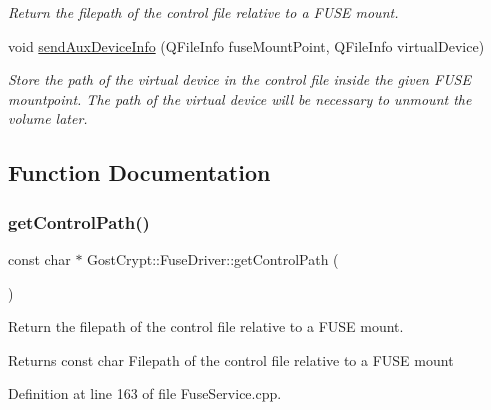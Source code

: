\begin{DoxyCompactItemize}
\begin{DoxyCompactList}\small\item\em Return the filepath of the control file relative to a F\+U\+SE mount. \end{DoxyCompactList}\item 
void \hyperlink{namespace_gost_crypt_1_1_fuse_driver_af0bbb5bc0d09fd490f41a93dc588ce1d}{send\+Aux\+Device\+Info} (Q\+File\+Info fuse\+Mount\+Point, Q\+File\+Info virtual\+Device)
\begin{DoxyCompactList}\small\item\em Store the path of the virtual device in the control file inside the given F\+U\+SE mountpoint. The path of the virtual device will be necessary to unmount the volume later. \end{DoxyCompactList}\end{DoxyCompactItemize}


\subsection{Function Documentation}
\mbox{\label{namespace_gost_crypt_1_1_fuse_driver_aea46579083a08cf177ef77110d5e6d2f}} 
\subsubsection{\texorpdfstring{get\+Control\+Path()}{getControlPath()}}
{\footnotesize\ttfamily const char $\ast$ Gost\+Crypt\+::\+Fuse\+Driver\+::get\+Control\+Path (\begin{DoxyParamCaption}{ }\end{DoxyParamCaption})}



Return the filepath of the control file relative to a F\+U\+SE mount. 

\begin{DoxyReturn}{Returns}
const char Filepath of the control file relative to a F\+U\+SE mount 
\end{DoxyReturn}


Definition at line 163 of file Fuse\+Service.\+cpp.

\mbox{\label{namespace_gost_crypt_1_1_fuse_driver_aea46c93ec99374bd8baf2d07ac6b492d}} 
